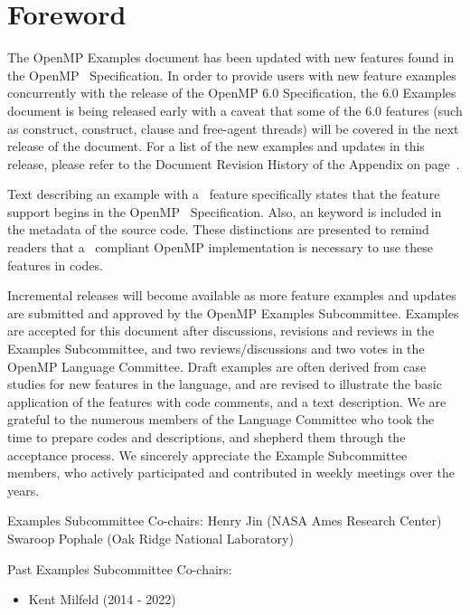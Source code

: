 \chapter*{Foreword}
\label{chap:foreword}

The OpenMP Examples document has been updated with new features
found in the OpenMP \SVER\ Specification. 
In order to provide users with new feature examples concurrently
with the release of the OpenMP 6.0 Specification, 
the 6.0 Examples document is being released early
with a caveat that some of the 6.0 features
(such as  construct,  construct,
 clause and free-agent threads) will be covered
in the next release of the document.
For a list of the new examples and updates in this release,
please refer to the Document Revision History of the Appendix on page~\pageref{chap:history}.

Text describing an example with a \SVER\ feature specifically states
that the feature support begins in the OpenMP \SVER\ Specification.  Also,
an  keyword is included in the  metadata of the source code.
These distinctions are presented to remind readers that a \SVER\ compliant 
OpenMP implementation is necessary to use these features in codes.

Incremental releases will become available as more feature examples
and updates are submitted and approved by the OpenMP Examples Subcommittee.
Examples are accepted for this document after discussions, revisions and reviews
in the Examples Subcommittee, and two reviews/discussions and two votes
in the OpenMP Language Committee.
Draft examples are often derived from case studies for new features in the language,
and are revised to illustrate the basic application of the features with code comments,
and a text description. We are grateful to the numerous members of the Language Committee 
who took the time to prepare codes and descriptions, and shepherd them through
the acceptance process. We sincerely appreciate the Example Subcommittee members, who 
actively participated and contributed in weekly meetings over the years.

\bigskip
Examples Subcommittee Co-chairs: \smallskip\linebreak
Henry Jin (\textsc{NASA} Ames Research Center) \linebreak
Swaroop Pophale (Oak Ridge National Laboratory)

\bigskip
\bigskip
Past Examples Subcommittee Co-chairs:
\begin{itemize}
\item Kent Milfeld (2014 - 2022)
\end{itemize}


